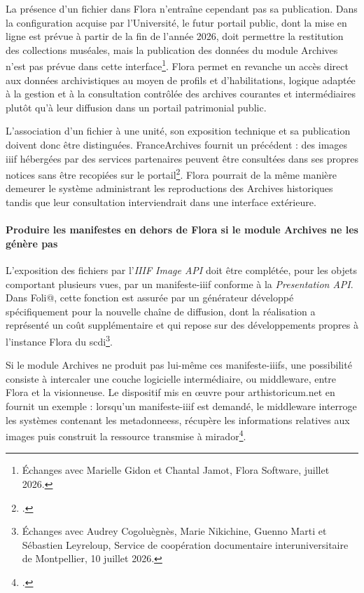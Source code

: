 La présence d'un fichier dans Flora n'entraîne cependant pas sa publication. Dans la configuration acquise par l'Université, le futur portail public, dont la mise en ligne est prévue à partir de la fin de l'année 2026, doit permettre la restitution des collections muséales, mais la publication des données du module Archives n'est pas prévue dans cette interface\footnote{Échanges avec Marielle Gidon et Chantal Jamot, Flora Software, juillet 2026.}. Flora permet en revanche un accès direct aux données archivistiques au moyen de profils et d'habilitations, logique adaptée à la gestion et à la consultation contrôlée des archives courantes et intermédiaires plutôt qu'à leur diffusion dans un portail patrimonial public.

L'association d'un fichier à une unité, son exposition technique et sa publication doivent donc être distinguées. FranceArchives fournit un précédent : des images \gls{iiif} hébergées par des services partenaires peuvent être consultées dans ses propres notices sans être recopiées sur le portail\footcite{FranceArchivesIIIF2026}. Flora pourrait de la même manière demeurer le système administrant les reproductions des Archives historiques tandis que leur consultation interviendrait dans une interface extérieure.

\paragraph{Produire les manifestes en dehors de Flora si le module Archives ne les génère pas}

L'exposition des fichiers par l'\emph{IIIF Image API} doit être complétée, pour les objets comportant plusieurs vues, par un \gls{manifeste-iiif} conforme à la \emph{Presentation API}. Dans Foli@, cette fonction est assurée par un générateur développé spécifiquement pour la nouvelle chaîne de diffusion, dont la réalisation a représenté un coût supplémentaire et qui repose sur des développements propres à l'instance Flora du \gls{scdi}\footnote{Échanges avec Audrey Cogoluègnès, Marie Nikichine, Guenno Marti et Sébastien Leyreloup, Service de coopération documentaire interuniversitaire de Montpellier, 10 juillet 2026.}.

Si le module Archives ne produit pas lui-même ces \glspl{manifeste-iiif}, une possibilité consiste à intercaler une couche logicielle intermédiaire, ou \gls{middleware}, entre Flora et la visionneuse. Le dispositif mis en œuvre pour arthistoricum.net en fournit un exemple : lorsqu'un \gls{manifeste-iiif} est demandé, le \gls{middleware} interroge les systèmes contenant les \glspl{metadonnees}, récupère les informations relatives aux images puis construit la ressource transmise à \gls{mirador}\footcite{WolffProbstBodenschatz2024}.

